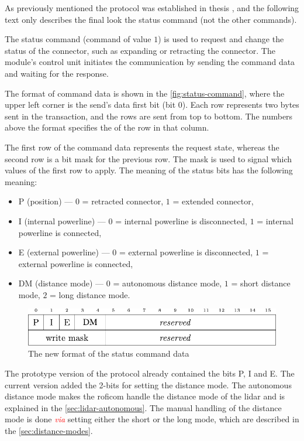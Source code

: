 \documentclass[
  digital,     %
  oneside,     %
  nosansbold,  %
  nocolorbold, %
  nolof,         %
  nolot,         %
]{fithesis4}
\newcommand{\TODO}[1]{\textcolor{red}{\textit{#1}}}
\begin{document}
{{{As previously mentioned the protocol was established in thesis \cite[p.~19--22]{Mrazek2019thesis}, and the following text only describes the final look the status command (not the other commands).

The status command (command of value $1$) is used to request and change the status of the connector, such as expanding or retracting the connector. The module's control unit initiates the communication by sending the command data and waiting for the response.

The format of command data is shown in the \autoref{fig:status-command}, where the upper left corner is the send's data first bit (bit $0$). Each row represents two bytes sent in the transaction, and the rows are sent from top to bottom. The numbers above the format specifies the of the row in that column.

The first row of the command data represents the request state, whereas the second row is a bit mask for the previous row. The mask is used to signal which values of the first row to apply. The meaning of the status bits has the following meaning:

\begin{itemize}
    \item P (position) --- $0$ = retracted connector, $1$ = extended connector,
    \item I (internal powerline) --- $0$ = internal powerline is disconnected, $1$ = internal powerline is connected,
    \item E (external powerline) --- $0$ = external powerline is disconnected, $1$ = external powerline is connected,
    \item DM (distance mode) --- $0$ = autonomous distance mode, $1$ = short distance mode, $2$ = long distance mode. 
\end{itemize}

\begin{figure}
    \includegraphics[width=\textwidth,height=\textheight,keepaspectratio]{assets/status_command_new.pdf}
    \caption[Status command data]{The new format of the status command data}
    \label{fig:status-command}
\end{figure}

The prototype version of the protocol already contained the bits P, I and E. The current version added the 2-bits for setting the distance mode. The autonomous distance mode makes the \acrshort{roficom} handle the distance mode of the \acrshort{lidar} and is explained in the \autoref{sec:lidar-autonomous}. The manual handling of the distance mode is done \TODO{via} setting either the short or the long mode, which are described in the \autoref{sec:distance-modes}.

}}}
\end{document}
